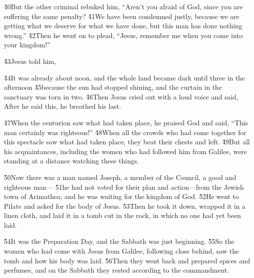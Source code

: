 \v{40}But the other criminal rebuked him, ``Aren't you afraid of God, since you are suffering the same penalty? \v{41}We have been condemned justly, because we are getting what we deserve for what we have done, but this man has done nothing wrong.'' \v{42}Then he went on to plead, ``Jesus, remember me when you come into your kingdom!''

\v{43}Jesus told him, 

\v{44}It was already about noon, and the whole land became dark until three in the afternoon \v{45}because the sun had stopped shining, and the curtain in the sanctuary was torn in two. \v{46}Then Jesus cried out with a loud voice and said,  After he said this, he breathed his last.

\v{47}When the centurion saw what had taken place, he praised God and said, ``This man certainly was righteous!'' \v{48}When all the crowds who had come together for this spectacle saw what had taken place, they beat their chests and left. \v{49}But all his acquaintances, including the women who had followed him from Galilee, were standing at a distance watching these things.

\v{50}Now there was a man named Joseph, a member of the Council, a good and righteous man--- \v{51}he had not voted for their plan and action---from the Jewish town of Arimathea; and he was waiting for the kingdom of God. \v{52}He went to Pilate and asked for the body of Jesus. \v{53}Then he took it down, wrapped it in a linen cloth, and laid it in a tomb cut in the rock, in which no one had yet been laid.

\v{54}It was the Preparation Day, and the Sabbath was just beginning. \v{55}So the women who had come with Jesus from Galilee, following close behind, saw the tomb and how his body was laid. \v{56}Then they went back and prepared spices and perfumes, and on the Sabbath they rested according to the commandment.

